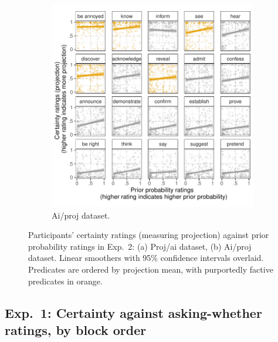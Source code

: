 \documentclass[11pt,fleqn]{article}
\newcommand{\6}{\mbox{$[\hspace*{-.6mm}[$}}
\newcommand{\9}{\mbox{$]\hspace*{-.6mm}]$}}
\begin{document}
\begin{figure}[h!]
\begin{subfigure}[t]{0.49\textwidth}
\includegraphics[width=.9\textwidth]{../../results/exp1/graphs/SUP-aiproj-projection-by-prior}
\caption{Ai/proj dataset.}
 \end{subfigure}
 
  
\caption{Participants' certainty ratings (measuring projection) against prior probability ratings in Exp.~2: (a) Proj/ai dataset, (b) Ai/proj dataset. Linear smoothers with 95\% confidence intervals overlaid. Predicates are ordered by projection mean, with purportedly factive predicates in orange.}
\end{figure}

\newpage

\subsection{Exp.~1: Certainty against asking-whether ratings, by block order}
\end{document}
